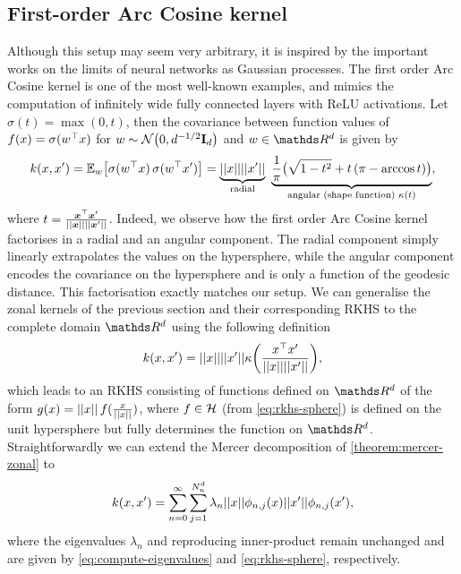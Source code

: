 \subsection{First-order Arc Cosine kernel}
\label{sec:arccosine}
Although this setup may seem very arbitrary, it is inspired by the important works on the limits of neural networks as Gaussian processes. The first order Arc Cosine kernel \citep{cho2009kernel} is one of the most well-known examples, and mimics the computation of infinitely wide fully connected layers with ReLU activations. Let $\sigma(t) = \max(0, t)$, then the covariance between function values of $f(x) = \sigma(w^{\top} x)$ for $w \sim \NormDist{0, d^{-1/2} \Eye_d}$ and $w \in \Reals^d$ is given by
\begin{equation}
\label{eq:arccosine}
    k(x, x') = \Exp{w}{\sigma(w\transpose x)\, \sigma(w\transpose x')} = \underbrace{\norm{x} \norm{x'}}_{\text{radial}}\ \underbrace{\frac{1}{\pi}\big( \sqrt{1 - t^2} + t\, (\pi - \arccos t) \big)}_{\text{angular (shape function) } \kappa(t)},
\end{equation}
where $t = \frac{\bm{x}^\top \bm{x}'}{\lvert\lvert \bm{x}\rvert\rvert\lvert\lvert \bm{x}'\rvert\rvert}$. Indeed, we observe how the first order Arc Cosine kernel factorises in a radial and an angular component. The radial component simply linearly extrapolates the values on the hypersphere, while the angular component encodes the covariance on the hypersphere and is only a function of the geodesic distance. This factorisation exactly matches our setup. We can generalise the zonal kernels of the previous section and their corresponding RKHS to the complete domain $\Reals^d$ using the following definition
\begin{equation}
    k(x, x') = \norm{x} \norm{x'} \kappa\left( \frac{x^\top x'}{\norm{x}\norm{x'}} \right), %
\end{equation}
which leads to an RKHS consisting of functions defined on $\Reals^d$ of the form $g(x) = \lvert\lvert x\rvert\rvert\,f(\frac{x}{\lvert\lvert x\rvert\rvert})$, where $f \in {\mathcal{H}}$ (from \cref{eq:rkhs-sphere}) is defined on the unit hypersphere but fully determines the function on $\Reals^d$. Straightforwardly we can extend the Mercer decomposition of \cref{theorem:mercer-zonal} to
\begin{equation}
    k(x, x') = \sum_{n=0}^{\infty} \sum_{j=1}^{N^d_n} \lambda_{n} \lvert\lvert x\rvert\rvert \phi_{n,j}(x) \lvert\lvert x'\rvert\rvert \phi_{n,j}(x'),
\end{equation}
where the eigenvalues $\lambda_n$ and reproducing inner-product remain unchanged and are given by \cref{eq:compute-eigenvalues} and \cref{eq:rkhs-sphere}, respectively.

